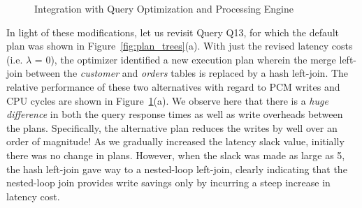 \begin{figure}[htpb]
\centering
	

\caption{Integration with Query Optimization and Processing Engine}
\label{fig:perf_comp}
\end{figure}

In light of these modifications, let us revisit Query Q13, for which
the default plan was shown in Figure~\ref{fig:plan_trees}(a). With
just the revised latency costs (i.e. $\lambda$ = 0), the optimizer
identified a new execution plan wherein the merge left-join between
the \textit{customer} and \textit{orders} tables is replaced
by a hash left-join.  The relative performance of these two
alternatives with regard to PCM writes and CPU cycles are shown in
Figure~\ref{fig:perf_comp}(a). We observe here that there is a \emph{huge
difference} in both the query response times as well as write overheads
between the plans.  Specifically, the alternative plan reduces the writes
by well over an order of magnitude!  As we gradually increased the
latency slack value, initially there was no change in plans. However,
when the slack was made as large as 5, the hash left-join gave way to
a nested-loop left-join, clearly indicating that the nested-loop join
provides write savings only by incurring a steep increase in latency cost.


